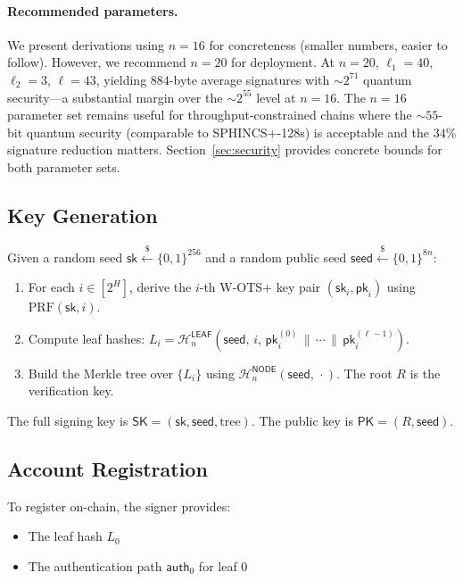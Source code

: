 \documentclass[11pt]{article}
\newcommand{\hash}{\mathcal{H}}
\newcommand{\prf}{\mathrm{PRF}}
\newcommand{\bin}{\{0,1\}}
\newcommand{\concat}{\,\|\,}
\begin{document}
\paragraph{Recommended parameters.}
We present derivations using $n = 16$ for concreteness (smaller
numbers, easier to follow). However, we recommend $n = 20$ for
deployment. At $n = 20$, $\ell_1 = 40$, $\ell_2 = 3$, $\ell = 43$,
yielding $884$-byte average signatures with ${\sim}2^{71}$ quantum
security---a substantial margin over the ${\sim}2^{55}$ level at
$n = 16$. The $n = 16$ parameter set remains useful for
throughput-constrained chains where the ${\sim}55$-bit quantum security
(comparable to SPHINCS+-128s) is acceptable and the $34\%$ signature
reduction matters. Section~\ref{sec:security} provides concrete bounds
for both parameter sets.

\subsection{Key Generation}

Given a random seed $\mathsf{sk} \xleftarrow{\$} \bin^{256}$ and a
random public seed $\mathsf{seed} \xleftarrow{\$} \bin^{8n}$:

\begin{enumerate}
\item For each $i \in [2^H]$, derive the $i$-th W-OTS+ key pair
$(\mathsf{sk}_i, \mathsf{pk}_i)$ using $\prf(\mathsf{sk}, i)$.
\item Compute leaf hashes:
$L_i = \hash_n^{\mathsf{LEAF}}(\mathsf{seed},\, i,\,
\mathsf{pk}_i^{(0)} \concat \cdots \concat
\mathsf{pk}_i^{(\ell-1)})$.
\item Build the Merkle tree over $\{L_i\}$ using
$\hash_n^{\mathsf{NODE}}(\mathsf{seed},\, \cdot)$.  The root $R$ is
the verification key.
\end{enumerate}

The full signing key is $\mathsf{SK} = (\mathsf{sk}, \mathsf{seed},
\text{tree})$. The public key is $\mathsf{PK} = (R, \mathsf{seed})$.

\subsection{Account Registration}

To register on-chain, the signer provides:
\begin{itemize}
\item The leaf hash $L_0$
\item The authentication path $\mathsf{auth}_0$ for leaf $0$
\end{itemize}
\end{document}
